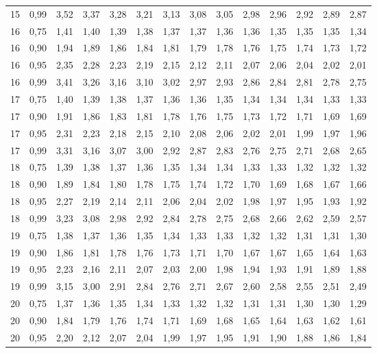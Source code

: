 \documentclass[
]{article}
\begin{document}
\begin{landscape}
\begin{longtable}[t]{cccccccccccccc}
15 & 0,99 & 3,52 & 3,37 & 3,28 & 3,21 & 3,13 & 3,08 & 3,05 & 2,98 & 2,96 & 2,92 & 2,89 & 2,87\\
16 & 0,75 & 1,41 & 1,40 & 1,39 & 1,38 & 1,37 & 1,37 & 1,36 & 1,36 & 1,35 & 1,35 & 1,35 & 1,34\\
16 & 0,90 & 1,94 & 1,89 & 1,86 & 1,84 & 1,81 & 1,79 & 1,78 & 1,76 & 1,75 & 1,74 & 1,73 & 1,72\\
16 & 0,95 & 2,35 & 2,28 & 2,23 & 2,19 & 2,15 & 2,12 & 2,11 & 2,07 & 2,06 & 2,04 & 2,02 & 2,01\\
16 & 0,99 & 3,41 & 3,26 & 3,16 & 3,10 & 3,02 & 2,97 & 2,93 & 2,86 & 2,84 & 2,81 & 2,78 & 2,75\\
17 & 0,75 & 1,40 & 1,39 & 1,38 & 1,37 & 1,36 & 1,36 & 1,35 & 1,34 & 1,34 & 1,34 & 1,33 & 1,33\\
17 & 0,90 & 1,91 & 1,86 & 1,83 & 1,81 & 1,78 & 1,76 & 1,75 & 1,73 & 1,72 & 1,71 & 1,69 & 1,69\\
17 & 0,95 & 2,31 & 2,23 & 2,18 & 2,15 & 2,10 & 2,08 & 2,06 & 2,02 & 2,01 & 1,99 & 1,97 & 1,96\\
17 & 0,99 & 3,31 & 3,16 & 3,07 & 3,00 & 2,92 & 2,87 & 2,83 & 2,76 & 2,75 & 2,71 & 2,68 & 2,65\\
18 & 0,75 & 1,39 & 1,38 & 1,37 & 1,36 & 1,35 & 1,34 & 1,34 & 1,33 & 1,33 & 1,32 & 1,32 & 1,32\\
18 & 0,90 & 1,89 & 1,84 & 1,80 & 1,78 & 1,75 & 1,74 & 1,72 & 1,70 & 1,69 & 1,68 & 1,67 & 1,66\\
18 & 0,95 & 2,27 & 2,19 & 2,14 & 2,11 & 2,06 & 2,04 & 2,02 & 1,98 & 1,97 & 1,95 & 1,93 & 1,92\\
18 & 0,99 & 3,23 & 3,08 & 2,98 & 2,92 & 2,84 & 2,78 & 2,75 & 2,68 & 2,66 & 2,62 & 2,59 & 2,57\\
19 & 0,75 & 1,38 & 1,37 & 1,36 & 1,35 & 1,34 & 1,33 & 1,33 & 1,32 & 1,32 & 1,31 & 1,31 & 1,30\\
19 & 0,90 & 1,86 & 1,81 & 1,78 & 1,76 & 1,73 & 1,71 & 1,70 & 1,67 & 1,67 & 1,65 & 1,64 & 1,63\\
19 & 0,95 & 2,23 & 2,16 & 2,11 & 2,07 & 2,03 & 2,00 & 1,98 & 1,94 & 1,93 & 1,91 & 1,89 & 1,88\\
19 & 0,99 & 3,15 & 3,00 & 2,91 & 2,84 & 2,76 & 2,71 & 2,67 & 2,60 & 2,58 & 2,55 & 2,51 & 2,49\\
20 & 0,75 & 1,37 & 1,36 & 1,35 & 1,34 & 1,33 & 1,32 & 1,32 & 1,31 & 1,31 & 1,30 & 1,30 & 1,29\\
20 & 0,90 & 1,84 & 1,79 & 1,76 & 1,74 & 1,71 & 1,69 & 1,68 & 1,65 & 1,64 & 1,63 & 1,62 & 1,61\\
20 & 0,95 & 2,20 & 2,12 & 2,07 & 2,04 & 1,99 & 1,97 & 1,95 & 1,91 & 1,90 & 1,88 & 1,86 & 1,84\\

\end{longtable}
\end{landscape}
\end{document}
